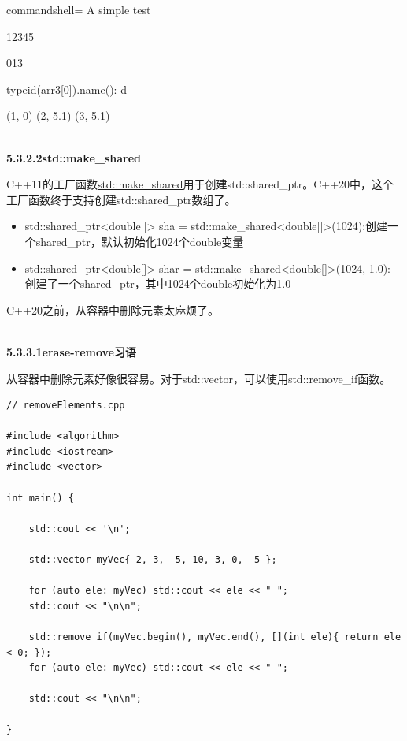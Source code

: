 \begin{tcblisting}{commandshell={}}
A simple test

12345

013

typeid(arr3[0]).name(): d

(1, 0)
(2, 5.1)
(3, 5.1)
\end{tcblisting}

\hspace*{\fill} \\ %
\noindent
\textbf{5.3.2.2\hspace{0.2cm}std::make\_shared}

C++11的工厂函数\href{https://en.cppreference.com/w/cpp/memory/shared_ptr/make_shared}{std::make\_shared}用于创建std::shared\_ptr。C++20中，这个工厂函数终于支持创建std::shared\_ptr数组了。

\begin{itemize}
\item 
std::shared\_ptr<double[]> sha = std::make\_shared<double[]>(1024):创建一个shared\_ptr，默认初始化1024个double变量

\item 
std::shared\_ptr<double[]> shar = std::make\_shared<double[]>(1024, 1.0): 创建了一个shared\_ptr，其中1024个double初始化为1.0
\end{itemize}


C++20之前，从容器中删除元素太麻烦了。

\hspace*{\fill} \\ %
\noindent
\textbf{5.3.3.1\hspace{0.2cm}erase-remove习语}

从容器中删除元素好像很容易。对于std::vector，可以使用std::remove\_if函数。

\begin{lstlisting}[style=styleCXX]
// removeElements.cpp

#include <algorithm>
#include <iostream>
#include <vector>

int main() {

	std::cout << '\n';
	
	std::vector myVec{-2, 3, -5, 10, 3, 0, -5 };
	
	for (auto ele: myVec) std::cout << ele << " ";
	std::cout << "\n\n";
	
	std::remove_if(myVec.begin(), myVec.end(), [](int ele){ return ele < 0; });
	for (auto ele: myVec) std::cout << ele << " ";
	
	std::cout << "\n\n";

}
\end{lstlisting}

